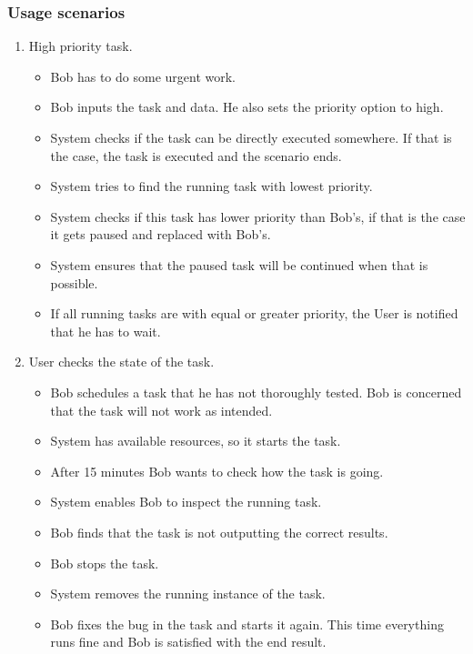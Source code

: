 \subsubsection{Usage scenarios}
\begin{enumerate}
  \item High priority task.
  \begin{itemize}
    \item Bob has to do some urgent work.
	\item Bob inputs the task and data. He also sets the priority option to high.
	\item System checks if the task can be directly executed somewhere.
	If that is the case, the task is executed and the scenario ends.
	\item System tries to find the running task with lowest priority.
	\item System checks if this task has lower priority than Bob's, if that is the case it gets paused and replaced with Bob's.
    \item System ensures that the paused task will be continued when that is possible.
	\item If all running tasks are with equal or greater priority, the User is notified that he has to wait.
  \end{itemize}
  \item User checks the state of the task.
  \begin{itemize}
    \item Bob schedules a task that he has not thoroughly tested.
    Bob is concerned that the task will not work as intended.
	\item System has available resources, so it starts the task.
	\item After 15 minutes Bob wants to check how the task is going.
	\item System enables Bob to inspect the running task.
	\item Bob finds that the task is not outputting the correct results.
	\item Bob stops the task.
	\item System removes the running instance of the task.
	\item Bob fixes the bug in the task and starts it again.
    This time everything runs fine and Bob is satisfied with the end result.
  \end{itemize}
\end{enumerate}
